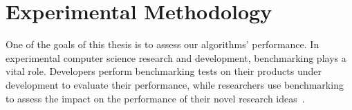 






\section{\label{sec:methodology}Experimental Methodology}

One of the goals of this thesis is to assess our algorithms' performance. In experimental computer science research and development, benchmarking plays a vital role. Developers perform benchmarking tests on their products under development to evaluate their performance, while researchers use benchmarking to assess the impact on the performance of their novel research ideas~\cite{DBLP_conf_oopsla_GeorgesBE07}.

